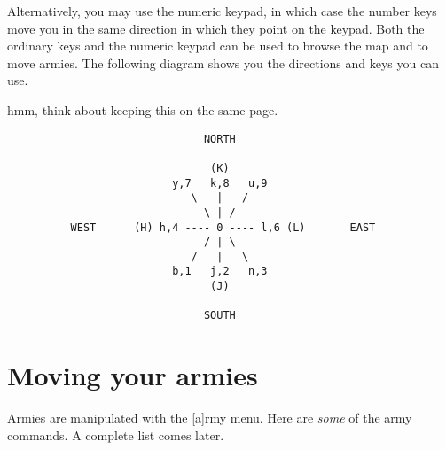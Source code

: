Alternatively, you may use the numeric keypad, in which case the
number keys move you in the same direction in which they point on the
keypad.  Both the ordinary keys and the numeric keypad can be used to
browse the map and to move armies.  The following diagram shows you
the directions and keys you can use.

\comment hmm, think about keeping this on the same page.
\comment \newpage
\begin{verbatim}
                               NORTH

                                (K)
                          y,7   k,8   u,9
                             \   |   /
                               \ | /
          WEST      (H) h,4 ---- 0 ---- l,6 (L)       EAST
                               / | \
                             /   |   \
                          b,1   j,2   n,3
                                (J)

                               SOUTH
\end{verbatim}

\section{Moving your armies}
Armies are manipulated with the [a]rmy menu.  Here are {\em some} of
the army commands.  A complete list comes later.

